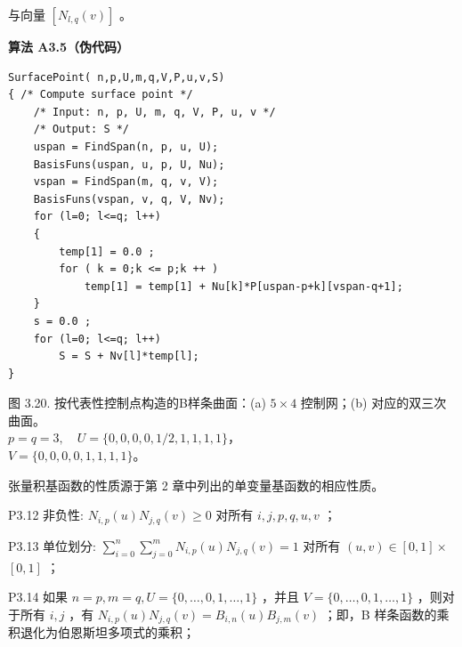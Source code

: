 \documentclass[../main.tex]{subfiles}
\begin{document}
与向量 \(\left\lbrack  {{N}_{l,q}\left( v\right) }\right\rbrack\) 。

\par\medskip\noindent\textbf{算法 A3.5（伪代码）}\par
\begin{verbatim}
SurfacePoint( n,p,U,m,q,V,P,u,v,S)
{ /* Compute surface point */
    /* Input: n, p, U, m, q, V, P, u, v */
    /* Output: S */
    uspan = FindSpan(n, p, u, U);
    BasisFuns(uspan, u, p, U, Nu);
    vspan = FindSpan(m, q, v, V);
    BasisFuns(vspan, v, q, V, Nv);
    for (l=0; l<=q; l++)
    {
        temp[1] = 0.0 ;
        for ( k = 0;k <= p;k ++ )
            temp[1] = temp[1] + Nu[k]*P[uspan-p+k][vspan-q+1];
    }
    s = 0.0 ;
    for (l=0; l<=q; l++)
        S = S + Nv[l]*temp[l];
}
\end{verbatim}



\begin{center}
\begin{minipage}{18cm}
\vspace*{.6\baselineskip}
\centering
{}
\par\medskip
{}
\par\smallskip
图 3.20. 按代表性控制点构造的B样条曲面：(a) \(5\times4\) 控制网；(b) 对应的双三次曲面。\\ \(p=q=3,\quad U=\{0,0,0,0,1/2,1,1,1,1\}\)，\\ \(V=\{0,0,0,0,1,1,1,1\}\)。
\end{minipage}
\end{center}

张量积基函数的性质源于第 2 章中列出的单变量基函数的相应性质。

P3.12 非负性: \({N}_{i,p}\left( u\right) {N}_{j,q}\left( v\right)  \geq  0\) 对所有 \(i,j,p,q,u,v\) ；

P3.13 单位划分: \(\mathop{\sum }\limits_{{i = 0}}^{n}\mathop{\sum }\limits_{{j = 0}}^{m}{N}_{i,p}\left( u\right) {N}_{j,q}\left( v\right)  = 1\) 对所有 \(\left( {u,v}\right)  \in  \left\lbrack  {0,1}\right\rbrack   \times\)  \(\left\lbrack  {0,1}\right\rbrack\) ；

P3.14 如果 \(n = p,m = q,U = \{ 0,\ldots ,0,1,\ldots ,1\}\) ，并且 \(V = \{ 0,\ldots ,0,1,\ldots ,1\}\) ，则对于所有 \(i,j\) ，有 \({N}_{i,p}\left( u\right) {N}_{j,q}\left( v\right)  = {B}_{i,n}\left( u\right) {B}_{j,m}\left( v\right)\) ；即，B 样条函数的乘积退化为伯恩斯坦多项式的乘积；
\end{document}
